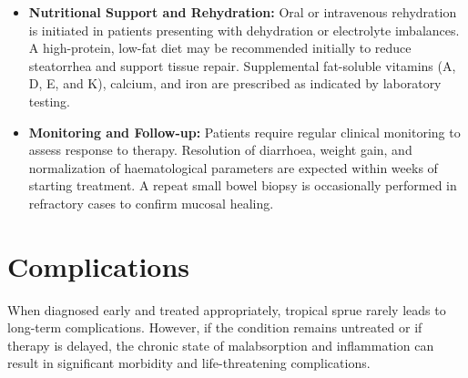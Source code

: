 \begin{itemize}
    \item \textbf{Nutritional Support and Rehydration:} Oral or intravenous rehydration is initiated in patients presenting with dehydration or electrolyte imbalances. A high-protein, low-fat diet may be recommended initially to reduce steatorrhea and support tissue repair. Supplemental fat-soluble vitamins (A, D, E, and K), calcium, and iron are prescribed as indicated by laboratory testing.
    \item \textbf{Monitoring and Follow-up:} Patients require regular clinical monitoring to assess response to therapy. Resolution of diarrhoea, weight gain, and normalization of haematological parameters are expected within weeks of starting treatment. A repeat small bowel biopsy is occasionally performed in refractory cases to confirm mucosal healing.
\end{itemize}

\section*{Complications}
When diagnosed early and treated appropriately, tropical sprue rarely leads to long-term complications. However, if the condition remains untreated or if therapy is delayed, the chronic state of malabsorption and inflammation can result in significant morbidity and life-threatening complications.

